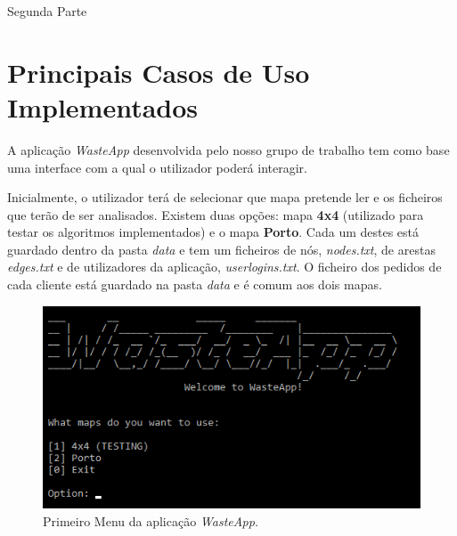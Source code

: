 \documentclass[article, a4paper, 12pt, oneside]{memoir}
\begin{document}
\newpage
\thispagestyle{plain}

\begin{center}
\LARGE Segunda Parte
\end{center}

\newpage
\chapter[Principais Casos de Uso Implementados][Principais Casos de Uso Implementados]{Principais Casos de Uso Implementados} \label{\thechapter}

A aplicação \textit{WasteApp} desenvolvida pelo nosso grupo de trabalho tem como base uma interface com a qual o utilizador poderá interagir. 

Inicialmente, o utilizador terá de selecionar que mapa pretende ler e os ficheiros que terão de ser analisados. Existem duas opções: mapa \textbf{4x4} (utilizado para testar os algoritmos implementados) e o mapa \textbf{Porto}. Cada um destes está guardado dentro da pasta \textit{data} e tem um ficheiros de nós, \textit{nodes.txt}, de arestas \textit{edges.txt} e de utilizadores da aplicação, \textit{userlogins.txt}. O ficheiro dos pedidos de cada cliente está guardado na pasta \textit{data} e é comum aos dois mapas. 

\begin{figure}[h!]
  \centerline{\includegraphics[scale=0.7]{wasteapp_1stmenu.png}}
  \caption{Primeiro Menu da aplicação \textit{WasteApp}.}
\end{figure}
\end{document}
